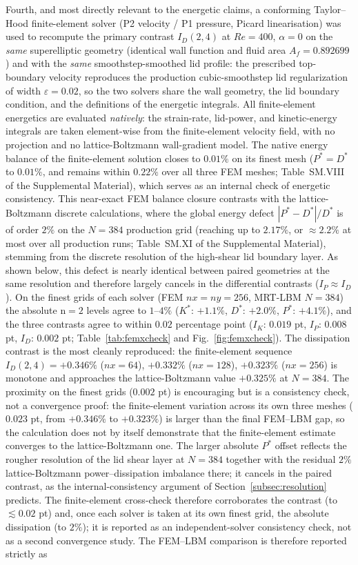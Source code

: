 Fourth, and most directly relevant to the energetic claims, a conforming Taylor--Hood finite-element solver (P2 velocity / P1 pressure, Picard linearisation) was used to recompute the primary contrast $I_D(2,4)$ at $Re=400$, $\alpha=0$ on the \emph{same} superelliptic geometry (identical wall function and fluid area $A_f=0.892699$) and with the \emph{same} smoothstep-smoothed lid profile: the prescribed top-boundary velocity reproduces the production cubic-smoothstep lid regularization of width $\varepsilon=0.02$, so the two solvers share the wall geometry, the lid boundary condition, and the definitions of the energetic integrals. All finite-element energetics are evaluated \emph{natively}: the strain-rate, lid-power, and kinetic-energy integrals are taken element-wise from the finite-element velocity field, with no projection and no lattice-Boltzmann wall-gradient model. The native energy balance of the finite-element solution closes to $0.01\%$ on its finest mesh ($P^*=D^*$ to $0.01\%$, and remains within $0.22\%$ over all three FEM meshes; Table~SM.VIII of the Supplemental Material), which serves as an internal check of energetic consistency. This near-exact FEM balance closure contrasts with the lattice-Boltzmann discrete calculations, where the global energy defect $|P^*-D^*|/D^*$ is of order $2\%$ on the $N=384$ production grid (reaching up to $2.17\%$, or $\approx 2.2\%$ at most over all production runs; Table~SM.XI of the Supplemental Material), stemming from the discrete resolution of the high-shear lid boundary layer. As shown below, this defect is nearly identical between paired geometries at the same resolution and therefore largely cancels in the differential contrasts ($I_P \approx I_D$). On the finest grids of each solver (FEM $nx=ny=256$, MRT-LBM $N=384$) the absolute n$=2$ levels agree to $1$--$4\%$ ($K^*$: $+1.1\%$, $D^*$: $+2.0\%$, $P^*$: $+4.1\%$), and the three contrasts agree to within $0.02$ percentage point ($I_K$: $0.019$ pt, $I_P$: $0.008$ pt, $I_D$: $0.002$ pt; Table~\ref{tab:femxcheck} and Fig.~\ref{fig:femxcheck}). The dissipation contrast is the most cleanly reproduced: the finite-element sequence $I_D(2,4)=+0.346\%$ ($nx=64$), $+0.332\%$ ($nx=128$), $+0.323\%$ ($nx=256$) is monotone and approaches the lattice-Boltzmann value $+0.325\%$ at $N=384$. The proximity on the finest grids ($0.002$ pt) is encouraging but is a consistency check, not a convergence proof: the finite-element variation across its own three meshes ($0.023$ pt, from $+0.346\%$ to $+0.323\%$) is larger than the final FEM--LBM gap, so the calculation does not by itself demonstrate that the finite-element estimate converges to the lattice-Boltzmann one. The larger absolute $P^*$ offset reflects the rougher resolution of the lid shear layer at $N=384$ together with the residual $2\%$ lattice-Boltzmann power--dissipation imbalance there; it cancels in the paired contrast, as the internal-consistency argument of Section~\ref{subsec:resolution} predicts. The finite-element cross-check therefore corroborates the contrast (to $\lesssim0.02$ pt) and, once each solver is taken at its own finest grid, the absolute dissipation (to $2\%$); it is reported as an independent-solver consistency check, not as a second convergence study. The FEM--LBM comparison is therefore reported strictly as 
